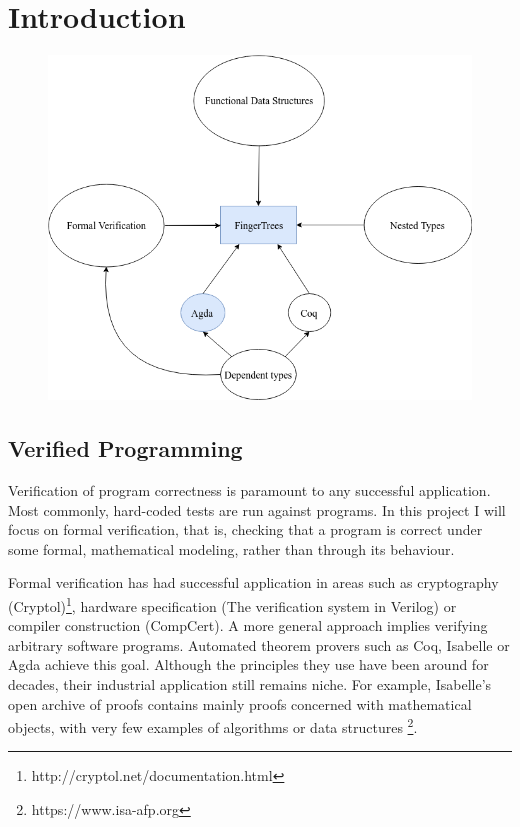 \documentclass[12pt,twoside,notitlepage]{report}
\begin{document}
\setcounter{page}{1}
\pagestyle{headings}


\chapter{Introduction}

\begin{figure}
\centering 

\includegraphics[scale=0.6]{flow}
\end{figure}
\section{Verified Programming}

Verification of program correctness is paramount to any successful application. Most commonly, hard-coded tests are run against programs. In this project I will focus on formal verification, that is, checking that a program is correct under some formal, mathematical modeling, rather than through its behaviour.
	
Formal verification has had successful application in areas such as cryptography (Cryptol)\footnote{http://cryptol.net/documentation.html}, hardware specification (The verification system in Verilog) or compiler construction (CompCert)\cite{compcert}. 
A more general approach implies verifying arbitrary software programs. Automated theorem provers such as Coq, Isabelle or Agda achieve this goal. Although the principles they use have been around for decades, their industrial application still remains niche. For example, Isabelle’s open archive of proofs contains mainly proofs concerned with mathematical objects, with very few examples of algorithms or data structures \footnote{https://www.isa-afp.org}. 
	
\end{document}
